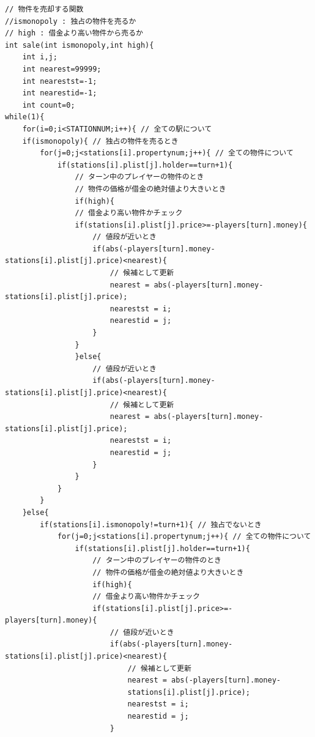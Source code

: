 \documentclass[a4j]{jarticle}
\begin{document}
        \begin{lstlisting}[basicstyle=\ttfamily\footnotesize, frame=single,label=sale,caption=sale関数]
// 物件を売却する関数
//ismonopoly : 独占の物件を売るか
// high : 借金より高い物件から売るか
int sale(int ismonopoly,int high){
    int i,j;
    int nearest=99999;
    int nearestst=-1;
    int nearestid=-1;
    int count=0;
while(1){
    for(i=0;i<STATIONNUM;i++){ // 全ての駅について
    if(ismonopoly){ // 独占の物件を売るとき
        for(j=0;j<stations[i].propertynum;j++){ // 全ての物件について
            if(stations[i].plist[j].holder==turn+1){ 
                // ターン中のプレイヤーの物件のとき
                // 物件の価格が借金の絶対値より大きいとき
                if(high){
                // 借金より高い物件かチェック
                if(stations[i].plist[j].price>=-players[turn].money){
                    // 値段が近いとき
                    if(abs(-players[turn].money-stations[i].plist[j].price)<nearest){
                        // 候補として更新
                        nearest = abs(-players[turn].money-stations[i].plist[j].price);
                        nearestst = i;
                        nearestid = j;                              
                    }
                }
                }else{
                    // 値段が近いとき
                    if(abs(-players[turn].money-stations[i].plist[j].price)<nearest){
                        // 候補として更新
                        nearest = abs(-players[turn].money-stations[i].plist[j].price);
                        nearestst = i;
                        nearestid = j;                              
                    }
                }
            }
        }
    }else{
        if(stations[i].ismonopoly!=turn+1){ // 独占でないとき
            for(j=0;j<stations[i].propertynum;j++){ // 全ての物件について
                if(stations[i].plist[j].holder==turn+1){ 
                    // ターン中のプレイヤーの物件のとき
                    // 物件の価格が借金の絶対値より大きいとき
                    if(high){
                    // 借金より高い物件かチェック
                    if(stations[i].plist[j].price>=-players[turn].money){
                        // 値段が近いとき
                        if(abs(-players[turn].money-stations[i].plist[j].price)<nearest){
                            // 候補として更新
                            nearest = abs(-players[turn].money-
                            stations[i].plist[j].price);
                            nearestst = i;
                            nearestid = j;                                 
                        }

\end{lstlisting}
\end{document}
